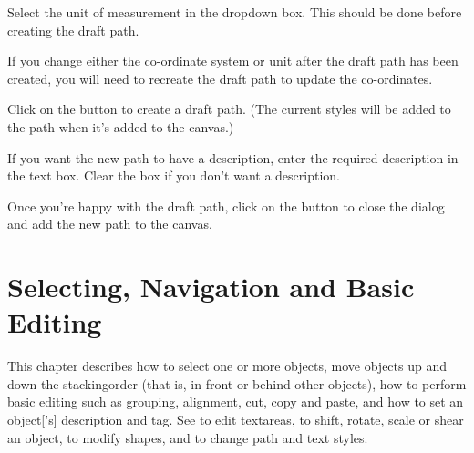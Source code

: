 
Select the unit of measurement in the  
\gls{dropdown} box. This should be done before creating the draft
path.

\begin{important}
If you change either the \gls{co-ordinate} system
or unit after the draft path has been created, you will need to recreate the
draft path to update the \glspl{co-ordinate}.
\end{important}


Click on the  button to create a draft path. (The current
styles will be added to the path when it's added to the canvas.)


If you want the new path to have a description, enter the required 
description in the  text box.
Clear the box if you don't want a description.

Once you're happy with the draft path, click on the 
button to close the dialog and add the new \gls{path} to the \gls{canvas}.

\chapter{Selecting, Navigation and Basic Editing}\label{sec:selectobjects}

This chapter describes how to select one or more \glspl{object},
move \glspl{object} up and down the \gls{stackingorder} (that is, in
front or behind other \glspl{object}), how to perform basic editing
such as grouping, alignment, cut, copy and paste, and how to set an \gls{object}['s]
description and tag. See  to edit
\glspl{textarea},  to shift, rotate,
scale or shear an \gls{object},
 to modify \glspl{shape},
and  to change path and text styles.


